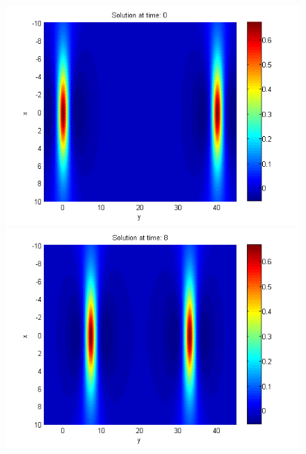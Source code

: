 \documentclass[11pt,a4paper,twoside]{article}
\begin{document}
\begin{figure}[!htbp]
	\centering
	\begin{minipage}[b]{0.31\linewidth}
		\includegraphics[width=\linewidth]{Pictures/Solution2_t=0.png}
	\end{minipage}	
	\begin{minipage}[b]{0.31\linewidth}
		\includegraphics[width=\linewidth]{Pictures/Solution2_t=8.png}
	\end{minipage}	
	\begin{minipage}[b]{0.31\linewidth}

\end{minipage}
\end{figure}
\end{document}
